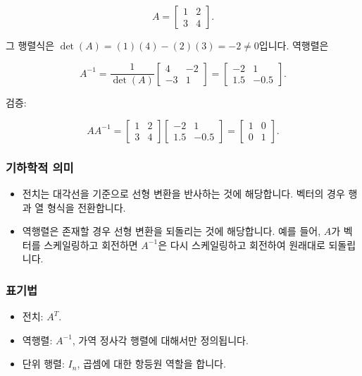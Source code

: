 \documentclass[
  12pt,
  a4paper,
]{article}
\begin{document}
\[A = \begin{bmatrix}
1 & 2 \\
3 & 4
\end{bmatrix}.\]

그 행렬식은 \(\det(A) = (1)(4) - (2)(3) = -2 \neq 0\)입니다. 역행렬은

\[A^{-1} = \frac{1}{\det(A)} \begin{bmatrix}
4 & -2 \\
-3 & 1
\end{bmatrix} =
\begin{bmatrix}
-2 & 1 \\
1.5 & -0.5
\end{bmatrix}.\]

검증:

\[AA^{-1} = \begin{bmatrix}
1 & 2 \\
3 & 4
\end{bmatrix}
\begin{bmatrix}
-2 & 1 \\
1.5 & -0.5
\end{bmatrix} =
\begin{bmatrix}
1 & 0 \\
0 & 1
\end{bmatrix}.\]

\subsubsection{기하학적 의미}\label{geometric-meaning-2}

\begin{itemize}
\item
  전치는 대각선을 기준으로 선형 변환을 반사하는 것에 해당합니다. 벡터의 경우 행과 열 형식을 전환합니다.
\item
  역행렬은 존재할 경우 선형 변환을 되돌리는 것에 해당합니다. 예를 들어, \(A\)가 벡터를 스케일링하고 회전하면 \(A^{-1}\)은 다시 스케일링하고 회전하여 원래대로 되돌립니다.
\end{itemize}

\subsubsection{표기법}\label{notation-6}

\begin{itemize}
\item
  전치: \(A^T\).
\item
  역행렬: \(A^{-1}\), 가역 정사각 행렬에 대해서만 정의됩니다.
\item
  단위 행렬: \(I_n\), 곱셈에 대한 항등원 역할을 합니다.
\end{itemize}
\end{document}
